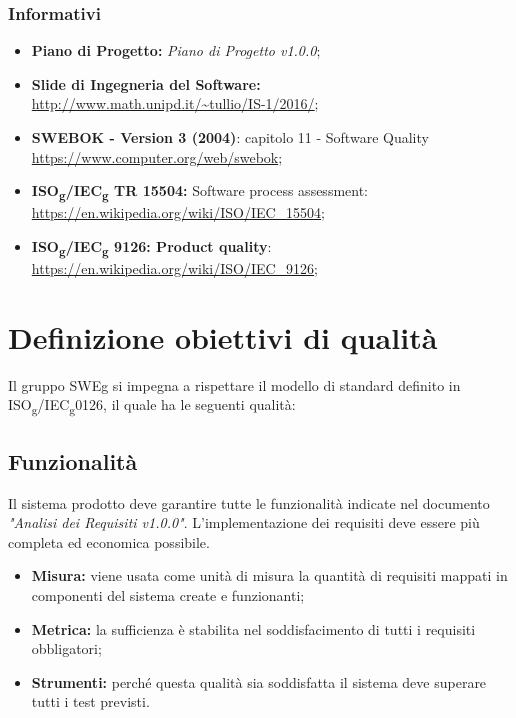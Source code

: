 \documentclass[12pt,a4paper,titlepage]{article}
\begin{document}
	\subsubsection{Informativi}
	\begin{itemize}
		\item \textbf{Piano di Progetto:} \textit{Piano di Progetto v1.0.0};
		\item \textbf{Slide di Ingegneria del Software:}\\ 
			\url{http://www.math.unipd.it/~tullio/IS-1/2016/};
		\item \textbf{SWEBOK - Version 3 (2004)}: capitolo 11 - Software Quality\\
			\url{https://www.computer.org/web/swebok};
		\item \textbf{ISO\textsubscript{g}/IEC\textsubscript{g} TR 15504:} Software process assessment:\\
			\url{https://en.wikipedia.org/wiki/ISO/IEC_15504};
		\item \textbf{ISO\textsubscript{g}/IEC\textsubscript{g} 9126: Product quality}:\\
			\url{https://en.wikipedia.org/wiki/ISO/IEC_9126};
	\end{itemize} 
	
	\section{Definizione obiettivi di qualità}
	Il gruppo SWEg si impegna a rispettare il modello di standard definito in ISO\textsubscript{g}/IEC\textsubscript{g}0126, il quale ha le seguenti qualità:
		\subsection{Funzionalità}
		Il sistema prodotto deve garantire tutte le funzionalità indicate nel documento \textit{"Analisi dei Requisiti v1.0.0"}. L'implementazione dei requisiti deve essere più completa ed economica possibile.
		\begin{itemize}
			\item \textbf{Misura:} viene usata come unità di misura la quantità di requisiti mappati in componenti del sistema create e funzionanti;
			\item \textbf{Metrica:} la sufficienza è stabilita nel soddisfacimento di tutti i requisiti obbligatori;
			\item \textbf{Strumenti:} perché questa qualità sia soddisfatta il sistema deve superare tutti i test previsti.
		\end{itemize}
\end{document}
